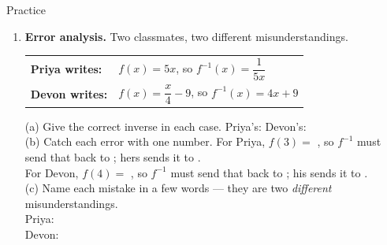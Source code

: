 \documentclass[10pt]{article}
\begin{document}
\begin{notesbox}{Practice}
\begin{enumerate}[leftmargin=1.9em, itemsep=11pt]
  \item \textbf{Error analysis.} Two classmates, two different misunderstandings.
    \begin{center}
    \begin{tcolorbox}[colback=white, colframe=charcoal!45, boxrule=0.7pt, arc=1.5mm,
        width=0.80\linewidth, left=3mm, right=3mm, top=1.5mm, bottom=1.5mm]
    \centering\small
    \renewcommand{\arraystretch}{1.5}
    \begin{tabular}{@{}l l@{}}
    \textbf{Priya writes:} & $f(x)=5x$, \; so \; $f^{-1}(x)=\dfrac{1}{5x}$ \\
    \textbf{Devon writes:} & $f(x)=\dfrac{x}{4}-9$, \; so \; $f^{-1}(x)=4x+9$ \\
    \end{tabular}
    \end{tcolorbox}
    \end{center}
    \vspace{-4pt}
    (a) Give the correct inverse in each case. \; Priya's:  \; Devon's:
     \\[3pt]
    (b) Catch each error with one number. For Priya, $f(3)=$ , so $f^{-1}$ must send
    that back to ; hers sends it to . \\[3pt]
    \hspace*{0.3in} For Devon, $f(4)=$ , so $f^{-1}$ must send that back to
    ; his sends it to . \\[3pt]
    (c) Name each mistake in a few words --- they are two \emph{different} misunderstandings. \\[2pt]
    Priya:  \\[3pt]
    Devon: 


\end{enumerate}
\end{notesbox}
\end{document}
